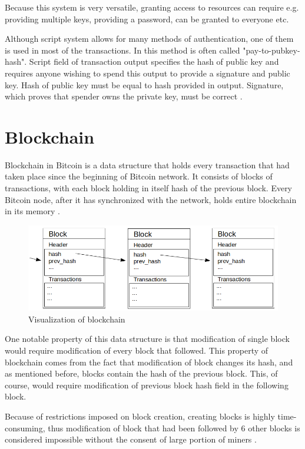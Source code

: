 \documentclass[12pt, en, eng, twoside, final]{mgr}
\begin{document}
Because this system is very versatile, granting access to resources can require e.g. providing multiple keys, providing a password, can be granted to everyone etc. 

Although script system allows for many methods of authentication, one of them is used in most of the transactions. In this method is often called "pay-to-pubkey-hash". Script field of transaction output specifies the hash of public key and requires anyone wishing to spend this output to provide a signature and public key. Hash of public key must be equal to hash provided in output. Signature, which proves that spender owns the private key, must be correct \cite{bitcoin-script}.


\section{Blockchain}
Blockchain in Bitcoin is a data structure that holds every transaction that had taken place since the beginning of Bitcoin network. It consists of blocks of transactions, with each block holding in itself hash of the previous block. Every Bitcoin node, after it has synchronized with the network, holds entire blockchain in its memory \cite{mastering-bitcoin}.

\begin{figure}[H]
  \includegraphics[width=0.8\linewidth]{blockchain.png}
  \caption{Visualization of blockchain}
  \label{fig:visualization-of-blockchain}
\end{figure}

One notable property of this data structure is that modification of single block would require modification of every block that followed. This property of blockchain comes from the fact that modification of block changes its hash, and as mentioned before, blocks contain the hash of the previous block. This, of course, would require modification of previous block hash field in the following block. 

Because of restrictions imposed on block creation, creating blocks is highly time-consuming, thus modification of block that had been followed by 6 other blocks is considered impossible without the consent of large portion of miners \cite{confirmation}.
\end{document}
